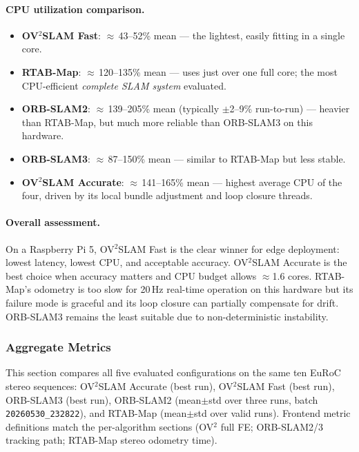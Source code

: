 \documentclass[11pt]{article}
\begin{document}
\paragraph{CPU utilization comparison.}
\begin{itemize}
    \item \textbf{OV$^2$SLAM Fast}: $\approx$\,43--52\% mean — the lightest, easily fitting in a single core.
    \item \textbf{RTAB-Map}: $\approx$\,120--135\% mean — uses just over one full core; the most CPU-efficient \emph{complete SLAM system} evaluated.
    \item \textbf{ORB-SLAM2}: $\approx$\,139--205\% mean (typically $\pm$2--9\% run-to-run) — heavier than RTAB-Map, but much more reliable than ORB-SLAM3 on this hardware.
    \item \textbf{ORB-SLAM3}: $\approx$\,87--150\% mean — similar to RTAB-Map but less stable.
    \item \textbf{OV$^2$SLAM Accurate}: $\approx$\,141--165\% mean — highest average CPU of the four, driven by its local bundle adjustment and loop closure threads.
\end{itemize}

\paragraph{Overall assessment.} On a Raspberry Pi 5, OV$^2$SLAM Fast is the clear winner for edge deployment: lowest latency, lowest CPU, and acceptable accuracy. OV$^2$SLAM Accurate is the best choice when accuracy matters and CPU budget allows $\approx$1.6 cores. RTAB-Map's odometry is too slow for 20\,Hz real-time operation on this hardware but its failure mode is graceful and its loop closure can partially compensate for drift. ORB-SLAM3 remains the least suitable due to non-deterministic instability.


\clearpage

\subsubsection{Aggregate Metrics}
\label{sec:total_comparison}

This section compares all five evaluated configurations on the same ten EuRoC stereo sequences: OV$^2$SLAM Accurate (best run), OV$^2$SLAM Fast (best run), ORB-SLAM3 (best run), ORB-SLAM2 (mean$\pm$std over three runs, batch \texttt{20260530\_232822}), and RTAB-Map (mean$\pm$std over valid runs). Frontend metric definitions match the per-algorithm sections (OV$^2$ full FE; ORB-SLAM2/3 tracking path; RTAB-Map stereo odometry time).
\end{document}

